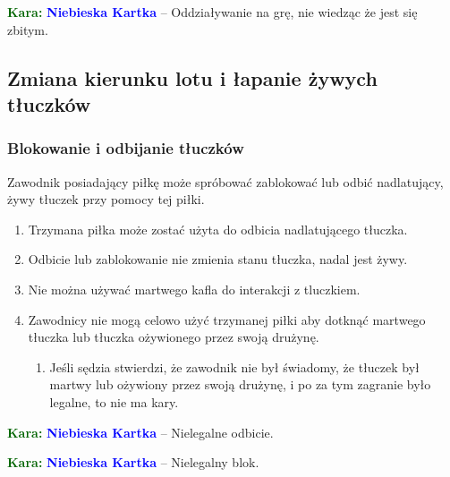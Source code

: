 \documentclass[11pt,a4paper]{article}
\newcommand\bluecard[1]{\bgroup\textcolor{darkgreen}{\textbf{Kara: }}\bgroup\textcolor{blue}{\textbf{Niebieska Kartka}} -- #1}
\begin{document}
\bluecard{Oddziaływanie na grę, nie wiedząc że jest się zbitym.}

\subsection{Zmiana kierunku lotu i łapanie żywych tłuczków}

\subsubsection{Blokowanie i odbijanie tłuczków}
Zawodnik posiadający piłkę może spróbować zablokować lub odbić nadlatujący, żywy tłuczek przy pomocy tej piłki.
\begin{enumerate}
  \item Trzymana piłka może zostać użyta do odbicia nadlatującego tłuczka.
  \item Odbicie lub zablokowanie nie zmienia stanu tłuczka, nadal jest żywy.
  \item Nie można używać martwego kafla do interakcji z tluczkiem.
  \item Zawodnicy nie mogą celowo użyć trzymanej piłki aby dotknąć martwego tłuczka lub tłuczka ożywionego przez swoją drużynę.
  \begin{enumerate}
    \item Jeśli sędzia stwierdzi, że zawodnik nie był świadomy, że tłuczek był martwy lub ożywiony przez swoją drużynę, i po za tym zagranie było legalne, to nie ma kary.
  \end{enumerate}
\end{enumerate}

\bluecard{Nielegalne odbicie.}

\bluecard{Nielegalny blok.}
\end{document}
